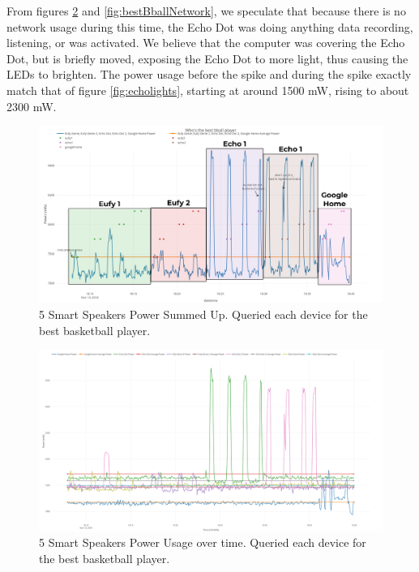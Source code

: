 From figures \ref{fig:bestBballSeperate} and \ref{fig:bestBballNetwork}, we speculate that because there is no network usage during this time, the Echo Dot was doing anything data recording, listening, or was activated. We believe that the computer was covering the Echo Dot, but is briefly moved, exposing the Echo Dot to more light, thus causing the LEDs to brighten. The power usage before the spike and during the spike exactly match that of figure \ref{fig:echolights}, starting at around 1500 mW, rising to about 2300 mW.

\begin{figure}[H]
  \centering
  \includegraphics[width=1\textwidth]{figures/bestBballSum.png}
  \caption{5 Smart Speakers Power Summed Up. Queried each device for the
  best basketball player.}
  \label{fig:bestBballSum}
\end{figure}

\begin{figure}[H]
  \centering
  \includegraphics[width=1\textwidth]{figures/bestBballSeperate.png}
  \caption{5 Smart Speakers Power Usage over time. Queried each device for the
  best basketball player.}
  \label{fig:bestBballSeperate}
\end{figure}

